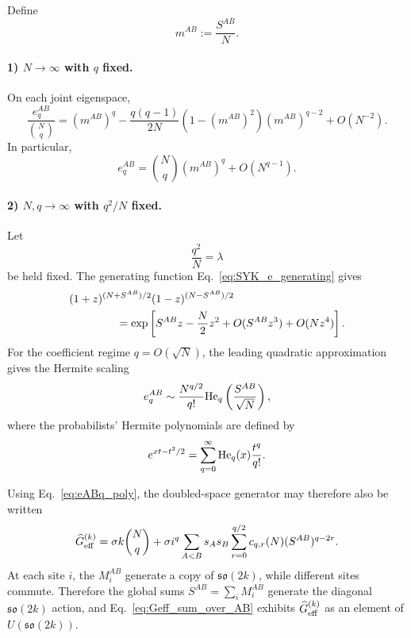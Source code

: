 \documentclass{article}
\theoremstyle{definition}
\begin{document}
Define
\begin{equation}
    m^{AB}
    :=
    \frac{S^{AB}}{N}.
\end{equation}

\paragraph{1) $N\rightarrow\infty$ with $q$ fixed.}

On each joint eigenspace,
\begin{equation}
    \frac{e_q^{AB}}{\binom Nq}
    =
    (m^{AB})^q
    -
    \frac{q(q-1)}{2N}
    \left(
       1-(m^{AB})^2
    \right)
    (m^{AB})^{q-2}
    +
    O(N^{-2}).
    \label{eq:eq_largeN_fixedq}
\end{equation}
In particular,
\begin{equation}
    e_q^{AB}
    =
    \binom Nq
    (m^{AB})^q
    +
    O(N^{q-1}).
\end{equation}

\paragraph{2) $N,q\rightarrow\infty$ with $q^2/N$ fixed.}

Let
\begin{equation}
    \frac{q^2}{N}
    =
    \lambda
\end{equation}
be held fixed.  The generating function
Eq.~\eqref{eq:SYK_e_generating} gives
\begin{align}
    &(1+z)^{(N+S^{AB})/2}
     (1-z)^{(N-S^{AB})/2}
    \nonumber\\
    &\hspace{15mm}
    =
    \exp\left[
       S^{AB}z
       -
       \frac N2z^2
       +
       O(S^{AB}z^3)
       +
       O(Nz^4)
    \right].
\end{align}
For the coefficient regime $q=O(\sqrt N)$, the leading quadratic
approximation gives the Hermite scaling
\begin{equation}
    e_q^{AB}
    \sim
    \frac{N^{q/2}}{q!}
    {\rm He}_q
    \left(
       \frac{S^{AB}}{\sqrt N}
    \right),
    \label{eq:eq_hermite_scaling}
\end{equation}
where the probabilists' Hermite polynomials are defined by
\begin{equation}
    e^{xt-t^2/2}
    =
    \sum_{q=0}^\infty
    {\rm He}_q(x)
    \frac{t^q}{q!}.
\end{equation}

Using Eq.~\eqref{eq:eABq_poly}, the doubled-space generator may therefore
also be written
\begin{equation}
    \widehat G_{\rm eff}^{(k)}
    =
    \sigma k\binom Nq
    +
    \sigma i^q
    \sum_{A<B}
    s_As_B
    \sum_{r=0}^{q/2}
    c_{q,r}(N)
    (S^{AB})^{q-2r}.
    \label{eq:Geff_sum_over_AB}
\end{equation}
At each site $i$, the $M_i^{AB}$ generate a copy of
$\mathfrak{so}(2k)$, while different sites commute.  Therefore the global
sums $S^{AB}=\sum_iM_i^{AB}$ generate the diagonal
$\mathfrak{so}(2k)$ action, and
Eq.~\eqref{eq:Geff_sum_over_AB} exhibits
$\widehat G_{\rm eff}^{(k)}$ as an element of
$U(\mathfrak{so}(2k))$.
\end{document}
